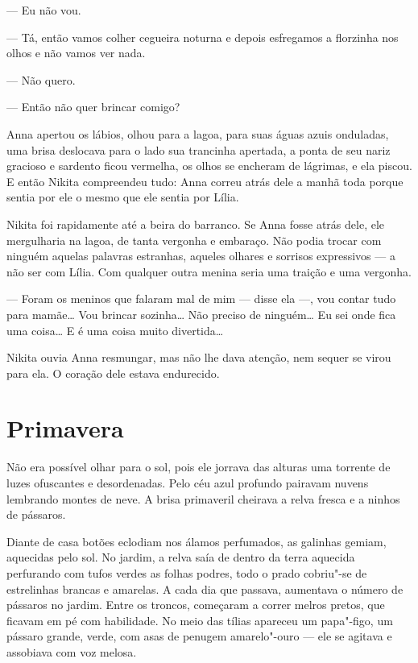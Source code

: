 --- Eu não vou.

--- Tá, então vamos colher cegueira noturna e depois esfregamos a
florzinha nos olhos e não vamos ver nada.

--- Não quero.

--- Então não quer brincar comigo?

Anna apertou os lábios, olhou para a lagoa, para suas águas azuis
onduladas, uma brisa deslocava para o lado sua trancinha apertada, a
ponta de seu nariz gracioso e sardento ficou vermelha, os olhos se
encheram de lágrimas, e ela piscou. E então Nikita compreendeu tudo:
Anna correu atrás dele a manhã toda porque sentia por ele o mesmo que
ele sentia por Lília.

Nikita foi rapidamente até a beira do barranco. Se Anna fosse atrás
dele, ele mergulharia na lagoa, de tanta vergonha e embaraço. Não podia
trocar com ninguém aquelas palavras estranhas, aqueles olhares e
sorrisos expressivos --- a não ser com Lília. Com qualquer outra menina
seria uma traição e uma vergonha.

--- Foram os meninos que falaram mal de mim --- disse ela ---, vou
contar tudo para mamãe\ldots{} Vou brincar sozinha\ldots{} Não preciso de
ninguém\ldots{} Eu sei onde fica uma coisa\ldots{} E é uma coisa muito
divertida\ldots{}

Nikita ouvia Anna resmungar, mas não lhe dava atenção, nem sequer se
virou para ela. O coração dele estava endurecido.

\chapter{Primavera}

Não era possível olhar para o sol, pois ele jorrava das alturas uma
torrente de luzes ofuscantes e desordenadas. Pelo céu azul profundo
pairavam nuvens lembrando montes de neve. A brisa primaveril cheirava a
relva fresca e a ninhos de pássaros.

Diante de casa botões eclodiam nos álamos perfumados, as galinhas
gemiam, aquecidas pelo sol. No jardim, a relva saía de dentro da terra
aquecida perfurando com tufos verdes as folhas podres, todo o prado
cobriu"-se de estrelinhas brancas e amarelas. A cada dia que passava,
aumentava o número de pássaros no jardim. Entre os troncos, começaram a
correr melros pretos, que ficavam em pé com habilidade. No meio das
tílias apareceu um papa"-figo, um pássaro grande, verde, com asas de
penugem amarelo"-ouro --- ele se agitava e assobiava com voz melosa.

